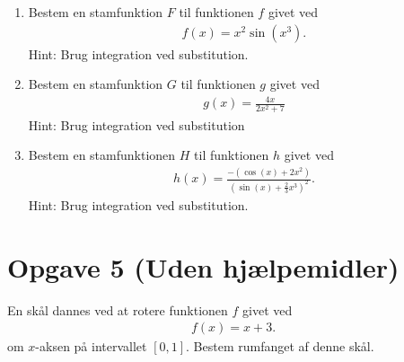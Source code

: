 \begin{enumerate}[label=\roman*)]
\item Bestem en stamfunktion $F$ til funktionen $f$ givet ved
\begin{align*}
f(x) = x^2\sin(x^3).
\end{align*}
Hint: Brug integration ved substitution.

\item Bestem en stamfunktion $G$ til funktionen $g$ givet ved
\begin{align*}
g(x) = \frac{4x}{2x^2+7}
\end{align*}
Hint: Brug integration ved substitution
\item Bestem en stamfunktionen $H$ til funktionen $h$ givet ved
\begin{align*}
h(x) = \frac{-(\cos(x)+2x^2)}{(\sin(x)+\frac{2}{3}x^3)^2}.
\end{align*}
Hint: Brug integration ved substitution.
\end{enumerate}


\section*{Opgave 5 (Uden hjælpemidler)}
En skål dannes ved at rotere funktionen $f$ givet ved
\begin{align*}
f(x) = x+3.
\end{align*}
om $x$-aksen på intervallet $[0,1]$. Bestem rumfanget af denne skål.
